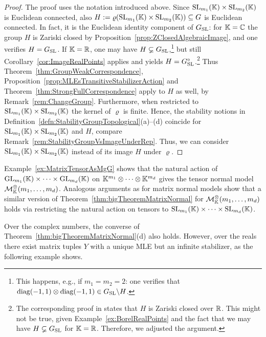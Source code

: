 \begin{proof}
	The proof uses the notation introduced above. Since $\operatorname{SL}_{m_1}(\mathbb K) \times \operatorname{SL}_{m_2}(\mathbb K)$ is Euclidean connected, also 
	$H := \varrho(\operatorname{SL}_{m_1}(\mathbb K) \times \operatorname{SL}_{m_2}(\mathbb K)) \subseteq G$ is Euclidean connected. In fact, it is the Euclidean identity component of $G_{\operatorname{SL}}$: for $\mathbb K = \mathbb C$ the group $H$ is Zariski closed by Proposition~\ref{prop:ZClosedAlgebraicImage}, and one verifies $H = G_{\operatorname{SL}}$. If $\mathbb K = \mathbb R$, one may have $H \varsubsetneq G_{\operatorname{SL}}$,\footnote{This happens, e.g., if $m_1 = m_2 = 2$: one verifies that $\operatorname{diag}(-1,1) \otimes \operatorname{diag}(-1,1) \in G_{\operatorname{SL}} \backslash H$.}
	but still Corollary~\ref{cor:ImageRealPoints} applies and yields $H = G_{\operatorname{SL}}^\circ$.\footnote{The corresponding proof in \cite{SiagaPaper} states that $H$ is Zariski closed over $\mathbb R$. This might not be true, given Example~\ref{ex:BorelRealPoints} and the fact that we may have $H \varsubsetneq G_{\operatorname{SL}}$ for $\mathbb K = \mathbb R$. Therefore, we adjusted the argument.}
	Thus Theorem~\ref{thm:GroupWeakCorrespondence}, Proposition~\ref{prop:MLEsTransitiveStabilizerAction} and Theorem~\ref{thm:StrongFullCorrespondence} apply to $H$ as well, by Remark~\ref{rem:ChangeGroup}.
	Furthermore, when restricted to $\operatorname{SL}_{m_1}(\mathbb K) \times \operatorname{SL}_{m_2}(\mathbb K)$ the kernel of $\varrho$ is finite. Hence, the stability notions in Definition~\ref{defn:StabilityGroupTopological}(a)--(d) coincide for $\operatorname{SL}_{m_1}(\mathbb K) \times \operatorname{SL}_{m_2}(\mathbb K)$ and $H$, compare Remark~\ref{rem:StabilityGroupVsImageUnderRep}. Thus, we can consider $\operatorname{SL}_{m_1}(\mathbb K) \times \operatorname{SL}_{m_2}(\mathbb K)$ instead of its image $H$ under $\varrho$.
\end{proof}

\begin{remark}\label{rem:CorrespondenceTensorNormal}
	Example~\ref{ex:MatrixTensorAsMgG} shows that the natural action of $\operatorname{GL}_{m_1}(\mathbb K) \times \cdots \times \operatorname{GL}_{m_d}(\mathbb K)$ on $\mathbb K^{m_1} \otimes \cdots \otimes \mathbb K^{m_d}$ gives the tensor normal model $\mathcal{M}^{\otimes}_{\mathbb{K}}(m_1, \ldots, m_d)$. Analogous arguments as for matrix normal models show that a similar version of Theorem~\ref{thm:bigTheoremMatrixNormal} for $\mathcal{M}^{\otimes}_{\mathbb{K}}(m_1, \ldots, m_d)$ holds via restricting the natural action on tensors to $\operatorname{SL}_{m_1}(\mathbb K) \times \cdots \times \operatorname{SL}_{m_d}(\mathbb K)$.
	\hfill\remSymbol
\end{remark}

Over the complex numbers, the converse of Theorem~\ref{thm:bigTheoremMatrixNormal}(d) also holds. However, over the reals there exist matrix tuples $Y$ with a unique MLE but an infinite stabilizer, as the following example shows.



